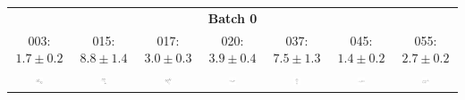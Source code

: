 \begin{tabular}{|c c c c c c c|}
\hline 
\multicolumn{7}{|c|}{{\small\textbf{Batch 0}}}\\ 
{\scriptsize 003: $ 1.7 \pm 0.2 $ } & {\scriptsize 015: $ 8.8 \pm 1.4 $ } & {\scriptsize 017: $ 3.0 \pm 0.3 $ } & {\scriptsize 020: $ 3.9 \pm 0.4 $ } & {\scriptsize 037: $ 7.5 \pm 1.3 $ } & {\scriptsize 045: $ 1.4 \pm 0.2 $ } & {\scriptsize 055: $ 2.7 \pm 0.2 $ } \\ 
\includegraphics[width = 0.14\textwidth]{2DImages/SAMPL5_003.pdf} & \includegraphics[width = 0.14\textwidth]{2DImages/SAMPL5_015.pdf} & \includegraphics[width = 0.14\textwidth]{2DImages/SAMPL5_017.pdf} & \includegraphics[width = 0.14\textwidth]{2DImages/SAMPL5_020.pdf} & \includegraphics[width = 0.14\textwidth]{2DImages/SAMPL5_037.pdf} & \includegraphics[width = 0.14\textwidth]{2DImages/SAMPL5_045.pdf} & \includegraphics[width = 0.14\textwidth]{2DImages/SAMPL5_055.pdf} \\ 

\end{tabular}
